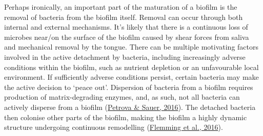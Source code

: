 \documentclass[
  letterpaper,
]{book}
\begin{document}
Perhaps ironically, an important part of the maturation of a biofilm is
the removal of bacteria from the biofilm itself. Removal can occur
through both internal and external mechanisms. It's likely that there is
a continuous loss of microbes near/on the surface of the biofilm caused
by shear forces from saliva and mechanical removal by the tongue. There
can be multiple motivating factors involved in the active detachment by
bacteria, including increasingly adverse conditions within the biofilm,
such as nutrient depletion or an unfavourable local environment. If
sufficiently adverse conditions persist, certain bacteria may make the
active decision to `peace out'. Dispersion of bacteria from a biofilm
requires production of matrix-degrading enzymes, and, as such, not all
bacteria can actively disperse from a biofilm
(\protect\hyperlink{ref-petrovaEscapingBiofilm2016}{Petrova \& Sauer,
2016}). The detached bacteria then colonise other parts of the biofilm,
making the biofilm a highly dynamic structure undergoing continuous
remodelling
(\protect\hyperlink{ref-flemmingBiofilmsEmergent2016}{Flemming et al.,
2016}).
\end{document}
